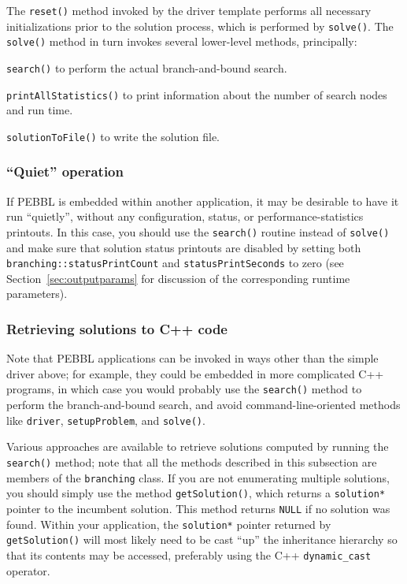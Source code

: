 The \texttt{reset()} method invoked by the driver template performs
all necessary initializations prior to the solution process, which is
performed by \texttt{solve()}.  The \texttt{solve()} method in turn
invokes several lower-level methods, principally:
\begin{description}
\item{\texttt{search()}} to perform the actual branch-and-bound
  search.  
\item{\texttt{printAllStatistics()}} to print information about the
  number of search nodes and run time.
\item{\texttt{solutionToFile()}} to write the solution file.
\end{description}

\subsubsection{``Quiet'' operation}
If PEBBL is embedded within another application, it may be desirable to
have it run ``quietly'', without any configuration, status, or
performance-statistics printouts.  In this case, you should use the
\texttt{search()} routine instead of \texttt{solve()} and make sure
that solution status printouts are disabled by setting both
\texttt{branching::statusPrintCount} and \texttt{statusPrintSeconds}
to zero (see Section~\ref{sec:outputparams} for discussion of the
corresponding runtime parameters).

\subsubsection{Retrieving solutions to C++ code}
\label{sec:serialgetsol}
Note that PEBBL applications can be invoked in ways other than the
simple driver above; for example, they could be embedded in more
complicated C++ programs, in which case you would probably use the
\texttt{search()} method to perform the branch-and-bound search, and
avoid command-line-oriented methods like \texttt{driver},
\texttt{setupProblem}, and \texttt{solve()}.  

Various approaches are available to retrieve solutions computed by
running the \texttt{search()} method; note that all the methods described in
this subsection are members of the \texttt{branching} class.  If you
are not enumerating multiple solutions, you should simply use the method
\texttt{getSolution()}, which returns a \texttt{solution*} pointer to
the incumbent solution.  This method returns \texttt{NULL} if no
solution was found.  Within your application, the \texttt{solution*}
pointer returned by \texttt{getSolution()} will most likely need to be
cast ``up'' the inheritance hierarchy so that its contents may be
accessed, preferably using the C++ \texttt{dynamic\_cast} operator.

